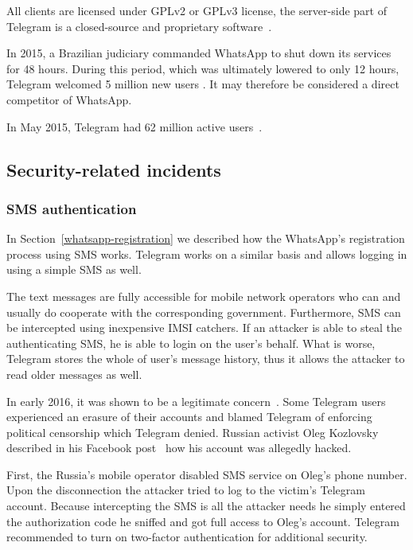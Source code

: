 \documentclass[thesis=M,english]{FITthesis}[2012/10/20]
\begin{document}
All clients are licensed under GPLv2 or GPLv3 license, the server-side part of Telegram is a closed-source and proprietary software~\cite{telegram-server}.

In 2015, a Brazilian judiciary commanded WhatsApp to shut down its services for 48 hours. During this period, which was ultimately lowered to only 12 hours, Telegram welcomed 5 million new users \cite{whatsappbrazil}. It may therefore be considered a direct competitor of WhatsApp.

In May 2015, Telegram had 62 million active users~\cite{telegram-users}.


\subsection{Security-related incidents}

\subsubsection{SMS authentication}

In Section~\ref{whatsapp-registration} we described how the WhatsApp's registration process using SMS works. Telegram works on a similar basis and allows logging in using a simple SMS as well.

The text messages are fully accessible for mobile network operators who can and usually do cooperate with the corresponding government. Furthermore, SMS can be intercepted using inexpensive IMSI catchers. If an attacker is able to steal the authenticating SMS, he is able to login on the user's behalf. What is worse, Telegram stores the whole of user's message history, thus it allows the attacker to read older messages as well.

In early 2016, it was shown to be a legitimate concern~\cite{telegram-smsiran}. Some Telegram users experienced an erasure of their accounts and blamed Telegram of enforcing political censorship which Telegram denied. Russian activist Oleg Kozlovsky described in his Facebook post~\cite{telegram-russia} how his account was allegedly hacked.

First, the Russia's mobile operator disabled SMS service on Oleg's phone number. Upon the disconnection the attacker tried to log to the victim's Telegram account. Because intercepting the SMS is all the attacker needs he simply entered the authorization code he sniffed and got full access to Oleg's account. Telegram recommended to turn on two-factor authentication for additional security.
\end{document}
